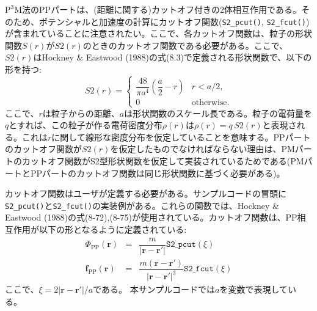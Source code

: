\ifCpp %

\endifCpp
\ifFtn %

\endifFtn
\ifC %

\endifC

$\mathrm{P^{3}M}$法のPPパートは、(距離に関する)カットオフ付きの2体相互作用である。そのため、ポテンシャルと加速度の計算にカットオフ関数(\texttt{S2\_pcut()}, \texttt{S2\_fcut()})が含まれていることに注意されたい。ここで、各カットオフ関数は、粒子の形状関数$S(r)$が$S2(r)$のときのカットオフ関数である必要がある。ここで、$S2(r)$はHockney \& Eastwood (1988)の式(8.3)で定義される形状関数で、以下の形を持つ:
\begin{equation}
S2(r) = \left\{
\begin{array}{ll}
\dfrac{48}{\pi a^{4}}\left(\dfrac{a}{2}-r\right) & r < a/2, \\
0 & \mathrm{otherwise}.
\end{array}
\right.
\end{equation}
ここで、$r$は粒子からの距離、$a$は形状関数のスケール長である。粒子の電荷量を$q$とすれば、この粒子が作る電荷密度分布$\rho(r)$は$\rho(r)=q\,S2(r)$と表現される。これは$r$に関して線形な密度分布を仮定していることを意味する。PPパートのカットオフ関数が$S2(r)$を仮定したものでなければならない理由は、PMパートのカットオフ関数がS2型形状関数を仮定して実装されているためである(PMパートとPPパートのカットオフ関数は同じ形状関数に基づく必要がある)。

カットオフ関数はユーザが定義する必要がある。サンプルコードの冒頭に\texttt{S2\_pcut()}と\texttt{S2\_fcut()}の実装例がある。これらの関数では、Hockney \& Eastwood (1988)の式(8-72),(8-75)が使用されている。カットオフ関数は、PP相互作用が以下の形となるように定義されている:
\begin{eqnarray}
\Phi_{\mathrm{PP}}(\bm{r}) & = & \dfrac{m}{|\bm{r}-\bm{r}'|}\mathtt{S2\_pcut}(\xi) \\
\bm{f}_{\mathrm{PP}}(\bm{r}) & = & \dfrac{m(\bm{r}-\bm{r}')}{|\bm{r}-\bm{r}'|^{3}}\mathtt{S2\_fcut}(\xi)
\end{eqnarray}
ここで、$\xi = 2|\bm{r}-\bm{r}'|/a$である。
本サンプルコードでは$a$を変数で表現している。


